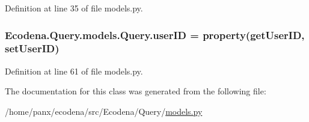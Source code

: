 Definition at line 35 of file models.py.

\hypertarget{class_ecodena_1_1_query_1_1models_1_1_query_a7b6043377cba81b1cd1f29dbba5a0a66}{
\subsubsection[{userID}]{\setlength{\rightskip}{0pt plus 5cm}Ecodena.Query.models.Query.userID = property(getUserID, setUserID)}}
\label{de/d81/class_ecodena_1_1_query_1_1models_1_1_query_a7b6043377cba81b1cd1f29dbba5a0a66}


Definition at line 61 of file models.py.



The documentation for this class was generated from the following file:\begin{DoxyCompactItemize}
\item 
/home/panx/ecodena/src/Ecodena/Query/\hyperlink{_query_2models_8py}{models.py}\end{DoxyCompactItemize}
